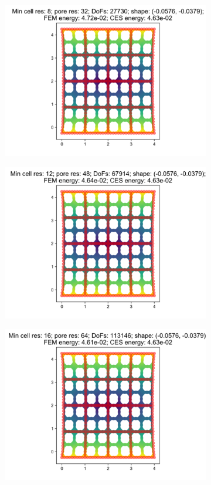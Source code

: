 \begin{figure}[H]
\begin{subfigure}{.45\textwidth}
\end{subfigure}
\begin{subfigure}{.45\textwidth}
  \centering
  \includegraphics[width=.8\linewidth]{lces/vis_tension/bm_1_mesh_3.png}
\end{subfigure}
\newline
\begin{subfigure}{.45\textwidth}
  \centering
  \includegraphics[width=.8\linewidth]{lces/vis_tension/bm_1_mesh_4.png}
\end{subfigure}
\begin{subfigure}{.45\textwidth}
  \centering
  \includegraphics[width=.8\linewidth]{lces/vis_tension/bm_1_mesh_5.png}
\end{subfigure}
\end{figure}

